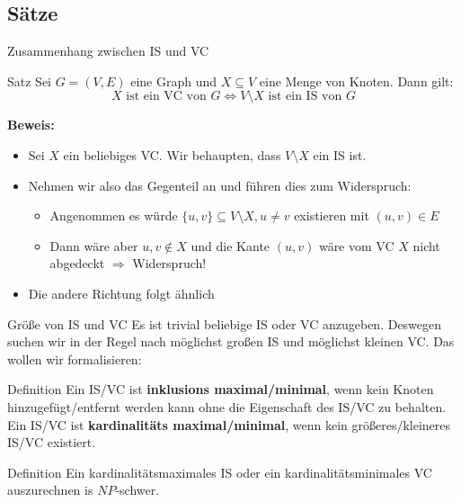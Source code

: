 \subsection{Sätze}
\begin{frame}{Zusammenhang zwischen IS und VC}
	\begin{block}{Satz}
		Sei $G=(V,E)$ eine Graph und $X\subseteq V$ eine Menge von Knoten. Dann gilt:
		\[X\text{ ist ein VC von $G$} \Longleftrightarrow V\setminus X\text{ ist ein IS von $G$}\]
	\end{block}
	\pause
	\textbf{Beweis:}
	\begin{itemize}
		\item Sei $X$ ein beliebiges VC. Wir behaupten, dass $V\setminus X$ ein IS ist.
		\item Nehmen wir also das Gegenteil an und führen dies zum Widerspruch:
		\pause
		\begin{itemize}
			\item Angenommen es würde $\{u,v\}\subseteq V\setminus X, u\neq v$ existieren mit $(u,v)\in E$
			\item Dann wäre aber $u,v\notin X$ und die Kante $(u,v)$ wäre vom VC $X$ nicht abgedeckt $\Rightarrow$ Widerspruch!
		\end{itemize}
		\pause
		\item Die andere Richtung folgt ähnlich
	\end{itemize}
\end{frame}
\begin{frame}{Größe von IS und VC}
	Es ist trivial beliebige IS oder VC anzugeben. Deswegen suchen wir in der Regel nach möglichst großen IS und möglichst kleinen VC. Das wollen wir formalisieren:
	\pause
	\begin{block}{Definition}
		Ein IS/VC ist \textbf{inklusions maximal/minimal}, wenn kein Knoten hinzugefügt/entfernt werden kann ohne die Eigenschaft des IS/VC zu behalten.\\
		\pause
		Ein IS/VC ist \textbf{kardinalitäts maximal/minimal}, wenn kein größeres/kleineres IS/VC existiert.
	\end{block}
	\pause
	\begin{block}{Definition}
		Ein kardinalitätsmaximales IS oder ein kardinalitätsminimales VC auszurechnen is $NP$-schwer.
	\end{block}
\end{frame}
